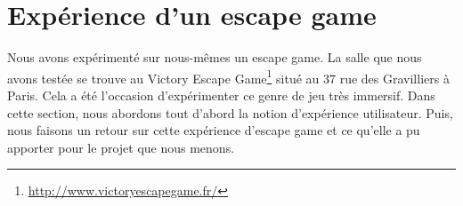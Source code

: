 \documentclass[11pt]{article}
\begin{document}

\section{Expérience d'un escape game}\label{sec:escape}
	Nous avons expérimenté sur nous-mêmes un escape game.
	La salle que nous avons testée se trouve au Victory Escape Game\footnote{\href{http://www.victoryescapegame.fr/}{http://www.victoryescapegame.fr/}} situé au 37 rue des Gravilliers à Paris.
	Cela a été l'occasion d'expérimenter ce genre de jeu très immersif. 
	Dans cette section, nous abordons tout d'abord la notion d'expérience utilisateur.
	Puis, nous faisons un retour sur cette expérience d'escape game et ce qu'elle a pu apporter pour le projet que nous menons.
\end{document}
